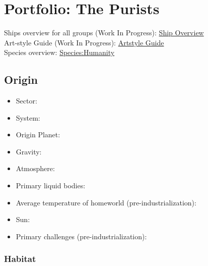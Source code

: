 \section{Portfolio: The Purists}
Ships overview for all groups (Work In Progress): \href{http://vegastrike.sourceforge.net/wiki/Artstyle\_guide:Overview\_Guide}{Ship Overview} \\
Art-style Guide (Work In Progress): \href{http://vegastrike.sourceforge.net/wiki/Artstyle\_guide:Purist}{Artstyle Guide} \\
Species overview: \href{http://vegastrike.sourceforge.net/wiki/Species:Humanity}{Species:Humanity} \\

\subsection{Origin}
\begin{itemize}
\item Sector: 
\item System: 
\item Origin Planet:  
\item Gravity: 

\item Atmosphere: 

\item Primary liquid bodies: 

\item Average temperature of homeworld (pre-industrialization):

\item Sun: 

\item Primary challenges (pre-industrialization): 
\end{itemize}


\subsubsection{Habitat}

